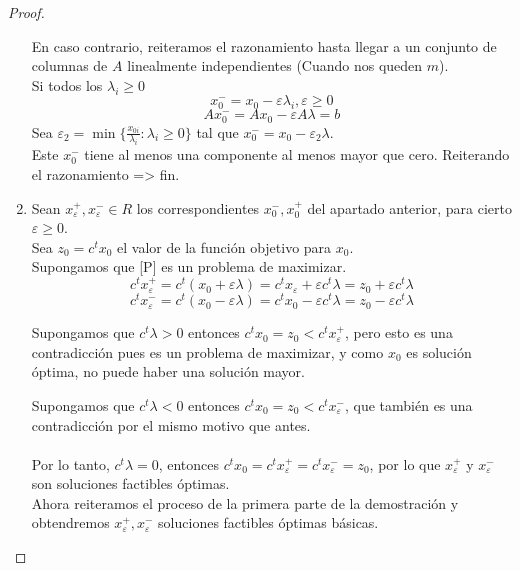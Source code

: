 \documentclass[11pt,fleqn]{book} %
\begin{document}
\begin{proof}
\begin{enumerate}
	En caso contrario, reiteramos el razonamiento hasta llegar a un conjunto de columnas de $A$ linealmente independientes (Cuando nos queden $m$). \\
	Si todos los $\lambda_i \geq 0$ \\
	$$
	x_0^-=x_0-\varepsilon \lambda_i, \varepsilon \geq 0
	$$
	$$
	Ax_0^-=Ax_0-\varepsilon A \lambda = b
	$$
	Sea $\varepsilon_2=\min\{ \frac{x_{0i}}{\lambda_i} : \lambda_i \geq 0 \}$ tal que $x_0^-=x_0- \varepsilon_2 \lambda$. \\
	Este $x_0^-$ tiene al menos una componente al menos mayor que cero. Reiterando el razonamiento => fin.
  \item Sean $x_\varepsilon^+, x_\varepsilon^- \in R$ los correspondientes $x_0^-, x_0^+$ del apartado anterior, para cierto $\varepsilon \geq 0$. \\
	Sea $z_0=c^t x_0$ el valor de la función objetivo para $x_0$. \\
	Supongamos que [P] es un problema de maximizar.
	$$
	c^t x_\varepsilon^+=c^t(x_0+\varepsilon \lambda)=c^tx_\varepsilon+\varepsilon c^t \lambda=z_0+\varepsilon c^t \lambda
	$$
	$$
	c^t x_\varepsilon^-=c^t(x_0-\varepsilon  \lambda)=c^t x_0-\varepsilon c^t \lambda = z_0- \varepsilon c^t\lambda
	$$
	 \par 
	Supongamos que $c^t \lambda >0$ entonces $c^t x_0=z_0< c^t x_\varepsilon^+$, pero esto es una contradicción pues es un problema de maximizar, y como $x_0$ es solución óptima, no puede haber una solución mayor. \\
	 \par 
	Supongamos que $c^t \lambda < 0$ entonces $c^tx_0=z_0<c^tx_\varepsilon^-$, que también es una contradicción por el mismo motivo que antes. \\
	\\
	Por lo tanto, $c^t \lambda = 0$, entonces $c^t x_0=c^t x_\varepsilon^+=c^t x_\varepsilon^-=z_0$, por lo que $x_\varepsilon^+$ y $x_\varepsilon^-$ son soluciones factibles óptimas. \\
	Ahora reiteramos el proceso de la primera parte de la demostración y obtendremos $x_\varepsilon^+, x_\varepsilon^-$ soluciones factibles óptimas básicas.
  \end{enumerate}
\end{proof}
\end{document}
